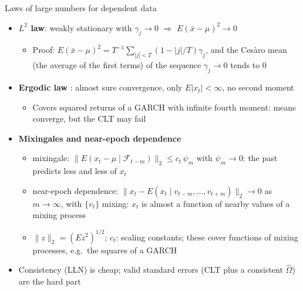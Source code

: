 \begin{frame}{Laws of large numbers for dependent data}
\itemsize{\small}
\begin{itemize}
    \item \textbf{$L^2$ law}: weakly stationary with $\gamma_j \to 0$ $\Rightarrow$ $E(\bar x - \mu)^2 \to 0$
    \begin{itemize}
        \item Proof: $E(\bar x - \mu)^2 = T^{-1}\sum_{|j|<T}(1 - |j|/T)\gamma_j$, and the Cesàro mean (the average of the first terms) of the sequence $\gamma_j \to 0$ tends to 0
    \end{itemize}
    \item \textbf{Ergodic law} : almost sure convergence, only $E|x_t| < \infty$, no second moment
    \begin{itemize}
        \item Covers squared returns of a GARCH with infinite fourth moment: means converge, but the CLT may fail
    \end{itemize}
    \item \textbf{Mixingales and near-epoch dependence} 
    \begin{itemize}
        \item mixingale: $\|E(x_t - \mu \mid \mathcal{F}_{t-m})\|_2 \le c_t\,\psi_m$ with $\psi_m \to 0$: the past predicts less and less of $x_t$
        \item near-epoch dependence: $\|x_t - E(x_t \mid v_{t-m}, \dots, v_{t+m})\|_2 \to 0$ as $m \to \infty$, with $\{v_t\}$ mixing: $x_t$ is almost a function of nearby values of a mixing process
        \item $\|z\|_2 = (E z^2)^{1/2}$; $c_t$: scaling constants; these cover functions of mixing processes, e.g.\ the squares of a GARCH
    \end{itemize}
    \item Consistency (LLN) is cheap; valid standard errors (CLT plus a consistent $\hat\Omega$) are the hard part
\end{itemize}
\end{frame}

